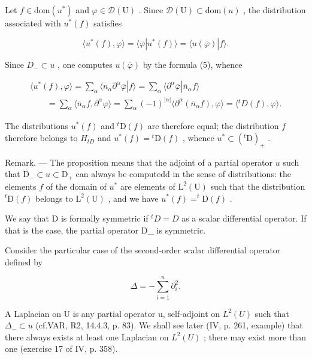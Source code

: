 Let \(f \in \mathrm{dom}(u^{*})\) and \(\varphi \in \mathcal{D}(\mathrm{U})\) . Since \(\mathcal{D}(\mathrm{U}) \subset \mathrm{dom}(u)\) , the distribution associated with \(u^{*}(f)\) satisfies

\[
\langle u ^ {*} (f), \varphi \rangle = \langle \overline {{\varphi}} | u ^ {*} (f) \rangle = \langle u (\overline {{\varphi}}) | f \rangle .
\]

Since \(D_{-} \subset u\) , one computes \(u(\overline{\varphi})\) by the formula (5), whence

\[
\begin{array}{l} \langle u ^ {*} (f), \varphi \rangle = \sum_ {\alpha} \langle n _ {\alpha} \partial^ {\alpha} \overline {{\varphi}} | f \rangle = \sum_ {\alpha} \langle \partial^ {\alpha} \overline {{\varphi}} | \overline {{n}} _ {\alpha} f \rangle \\ \qquad = \sum_ {\alpha} \langle \overline {{n}} _ {\alpha} f, \partial^ {\alpha} \varphi \rangle = \sum_ {\alpha} (- 1) ^ {| \alpha |} \langle \partial^ {\alpha} (\overline {{n}} _ {\alpha} f), \varphi \rangle = \langle {} ^ {t} D (f), \varphi \rangle . \end{array}
\]

The distributions \(u^{*}(f)\) and \({}^{t}\mathrm{D}(f)\) are therefore equal; the distribution \(f\) therefore belongs to \(H_{tD}\) and \(u^{*}(f)={}^{t}\mathrm{D}(f)\) , whence \(u^{*}\subset({}^{t}\mathrm{D})_{+}\) .

Remark. --- The proposition means that the adjoint of a partial operator \(u\) such that \(\mathrm{D}_{-} \subset u \subset \mathrm{D}_{+}\) can always be computedd in the sense of distributions: the elements \(f\) of the domain of \(u^{*}\) are elements of \(\mathrm{L}^{2}(\mathrm{U})\) such that the distribution \(^{t}\mathrm{D}(f)\) belongs to \(\mathrm{L}^{2}(\mathrm{U})\) , and we have \(u^{*}(f) = ^{t}\mathrm{D}(f)\) .

We say that D is formally symmetric if \({}^{t}D = D\) as a scalar differential operator. If that is the case, the partial operator D\_ is symmetric.

Consider the particular case of the second-order scalar differential operator defined by

\[
\Delta = - \sum_ {i = 1} ^ {n} \partial_ {i} ^ {2}.
\]

A Laplacian on U is any partial operator u, self-adjoint on \(L^{2}(U)\) such that \(\Delta_{-} \subset u\) (cf.VAR, R2, 14.4.3, p. 83). We shall see later (IV, p. 261, example) that there always exists at least one Laplacian on \(L^{2}(U)\) ; there may exist more than one (exercise 17 of IV, p. 358).